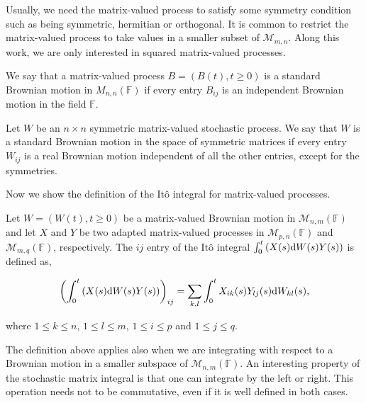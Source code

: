Usually, we need the matrix-valued process to satisfy some symmetry condition such as being symmetric, hermitian or orthogonal. It is common to restrict the matrix-valued process to take values in a smaller subset of $\mathcal M_{m,n}$. Along this work, we are only interested in squared matrix-valued processes.

\begin{example}
    We say that a matrix-valued process $B = (B(t), t \ge 0)$ is a standard Brownian motion in $M_{n,n}(\mathbb F)$ if every entry $B_{ij}$ is an independent Brownian motion in the field $\mathbb F$.
\end{example}

\begin{example}
    Let $W$ be an $n\times n$ symmetric matrix-valued stochastic process. We say that $W$ is a standard Brownian motion in the space of symmetric matrices if every entry $W_{ij}$ is a real Brownian motion independent of all the other entries, except for the symmetries.
\end{example}


Now we show the definition of the Itô integral for matrix-valued processes.

\begin{definition}
    Let $W = (W(t), t \ge 0)$ be a matrix-valued Brownian motion in $\mathcal M_{n,m}(\mathbb F)$ and let $X$ and $Y$ be two adapted matrix-valued processes in $\mathcal M_{p,n}(\mathbb F)$ and $\mathcal M_{m,q}(\mathbb F)$, respectively. The $ij$ entry of the Itô integral $\int_0^t \left(X(s)\mathrm d W(s) Y(s)\right)$ is defined as,

    \begin{equation*}
        \left( \int_0^t \left(X(s)\mathrm d W(s) Y(s)\right) \right)_{ij} = \sum_{k,l} \int_0^t X_{ik}(s)Y_{lj}(s) \mathrm d W_{kl}(s),
    \end{equation*}

    \noindent where $1 \le k \le n$, $1 \le l \le m$, $1 \le i \le p$ and $1 \le j \le q$. 
\end{definition}

The definition above applies also when we are integrating with respect to a Brownian motion in a smaller subspace of $\mathcal M_{n,m}(\mathbb F)$. An interesting property of the stochastic matrix integral is that one can integrate by the left or right. This operation needs not to be commutative, even if it is well defined in both cases. 

